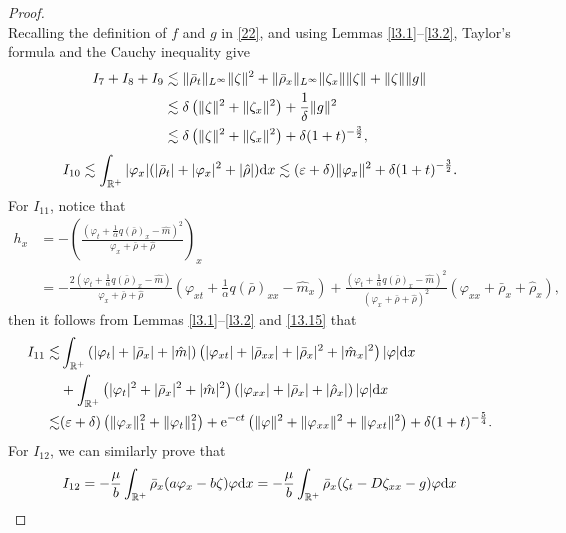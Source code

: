 \documentclass[11pt]{article}
\theoremstyle{plain}
\numberwithin{equation}{section}
\begin{document}
\begin{proof}
\begin{equation}
		\end{equation}
		Recalling the definition of $f$ and $g$ in \eqref{22}, and using Lemmas \ref{l3.1}--\ref{l3.2}, Taylor's formula and the Cauchy inequality give
		\begin{align}\label{I789}
			I_{7}+I_{8}+I_9&\lesssim\|\bar\rho_t\|_{L^{\infty}}\|\zeta\|^2+\|\bar\rho_x\|_{L^{\infty}}\|\zeta_x\|\|\zeta\|+\|\zeta\|\|g\|\notag\\
			 &\lesssim \delta\left(\|\zeta\|^2+\|\zeta_x\|^2\right)+\frac{1}{\delta}\|g\|^2\notag\\&\lesssim\delta\left(\|\zeta\|^2+\|\zeta_x\|^2\right)+\delta(1+t)^{-\frac{3}{2}},
		\end{align}
		\begin{equation}\label{I10}
			I_{10}\lesssim \int_{\mathbb{R^+}}|\varphi_x|(|\bar\rho_t|+|\varphi_x|^2+|\hat \rho|){\rm d}x\lesssim(\varepsilon+\delta)\|\varphi_x\|^2+\delta(1+t)^{-\frac{3}{2}}.
		\end{equation}
		For  $I_{11}$, notice that
		\begin{align}\label{hx}
			h_x&=-\left(\frac{\left(\varphi_t+\frac{1}{\alpha}q(\bar\rho)_x-\hat m\right)^2}{\varphi_x+\bar\rho+\hat\rho}\right)_x\nonumber\\
			&=-\frac{2\left(\varphi_t+\frac{1}{\alpha}q(\bar\rho)_x-\hat m\right)}{\varphi_x+\bar\rho+\hat\rho}\left(\varphi_{xt}+\frac{1}{\alpha}q(\bar\rho)_{xx}-\hat m_x\right)+\frac{\left(\varphi_t+\frac{1}{\alpha}q(\bar\rho)_x-\hat m\right)^2}{\left(\varphi_x+\bar\rho+\hat\rho\right)^2}\left(\varphi_{xx}+\bar\rho_{x}+\hat\rho_x\right),
		\end{align}
		then it follows from Lemmas \ref{l3.1}--\ref{l3.2} and \eqref{13.15} that
		\begin{align}\label{I11}
			I_{11}\lesssim&
			\int_{\mathbb{R}^+}\left(|\varphi_t|+|\bar\rho_x|+|\hat m|\right)\left(|\varphi_{xt}|+|\bar\rho_{xx}|+|\bar\rho_x|^2+|\hat m_x|^2\right)|\varphi|{\rm d}x\notag\\
			&+\int_{\mathbb{R}^+}\left(|\varphi_t|^2+|\bar\rho_x|^2+|\hat m|^2\right)\left(|\varphi_{xx}|+|\bar\rho_{x}|+|\hat\rho_x|\right)|\varphi|{\rm d}x\notag\\
			\lesssim&(\varepsilon+\delta)\left(\|\varphi_x\|_1^2+\|\varphi_t\|_1^2\right)+{\rm e}^{-ct}\left(\|\varphi\|^2+\|\varphi_{xx}\|^2+\|\varphi_{xt}\|^2\right) +\delta(1+t)^{-\frac{5}{4}}.
		\end{align}
		For $I_{12}$, we can similarly prove that
		\begin{align}\label{I12}
			I_{12}&=-\frac{\mu}{b}\int_{\mathbb{R}^+}\bar\rho_x(a\varphi_x-b\zeta)\varphi{\rm d}x=-\frac{\mu}{b}\int_{\mathbb{R}^+}\bar\rho_x(\zeta_t-D\zeta_{xx}-g)\varphi{\rm d}x\notag\\

\end{align}
\end{proof}
\end{document}
